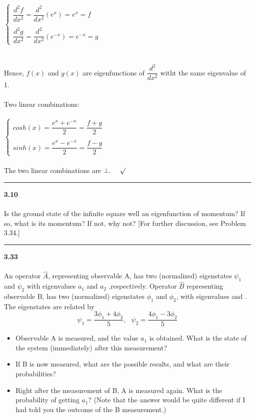 \documentclass[fleqn]{article}
\begin{document}
\begin{itemize}
      \textcolor{hwColor}{
        $
          \begin{cases}
            \dfrac{d^2 f}{dx^2}=\dfrac{d^2}{dx^2} \left(e^x\right)=e^x=f \\
            \\
            \dfrac{d^2 g}{dx^2}=\dfrac{d^2}{dx^2} \left(e^{-x}\right)=e^{-x}=g
          \end{cases}
        $ \\
        \\
        \\
        Hence, $f(x)$ and $g(x)$ are eigenfunctions of $\dfrac{d^2}{dx^2}$ witht the same eigenvalue of 1. \\
        \\
        Two linear combinations: \\
        \\
        $
          \begin{cases}
            cosh(x)=\dfrac{e^x+e^{-x}}{2}=\dfrac{f+g}{2} \\
            \\
            sinh(x)=\dfrac{e^x-e^{-x}}{2}=\dfrac{f-g}{2} 
          \end{cases}
        $ \\
        \\
        The two linear combinations are $\bot. ~~~~ \surd$
      }
    
  \end{itemize}


  \rule{15cm}{1pt}

  \textbf{3.10} \\ \\
  Is the ground state of the infinite square well an eigenfunction of
  momentum? If so, what is its momentum? If not, why not? [For further
  discussion, see Problem 3.34.]


  \rule{15cm}{1pt}

  \textbf{3.33} \\ \\
  An operator $\hat{A}$, representing observable
  A, has two (normalized) eigenstates $\psi_1$ and $\psi_2$ with eigenvalues $a_1$ and $a_2$
  ,respectively. Operator $\hat{B}$ representing observable B, has two (normalized)
  eigenstates $\phi_1$ and $\phi_2$, with eigenvalues and . The eigenstates are related
  by
  $$\psi_1=\dfrac{3\phi_1+4\phi_2}{5}, ~~~ \psi_2=\dfrac{4\phi_1-3\phi_2}{5}$$
  \begin{itemize}
    \item Observable A is measured, and the value $a_1$ is obtained. What is the state
    of the system (immediately) after this measurement?

    \item If B is now measured, what are the possible results, and what are their
    probabilities?
    
    \item Right after the measurement of B, A is measured again. What is the
    probability of getting $a_1$? (Note that the answer would be quite different if
    I had told you the outcome of the B measurement.)
    
  \end{itemize}
\end{document}
